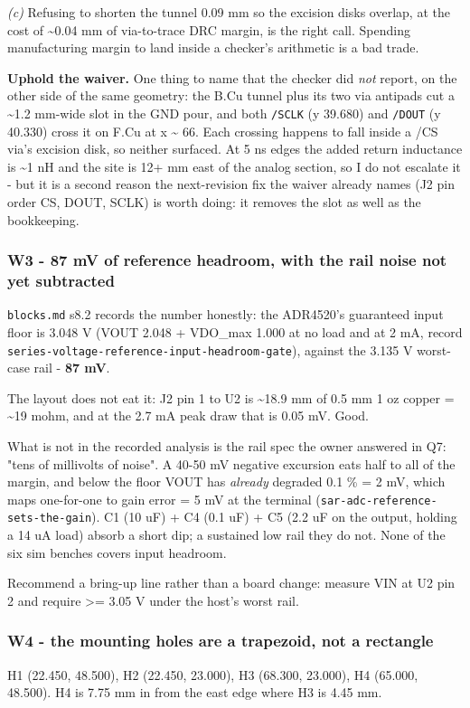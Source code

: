 \documentclass[11pt,a4paper]{article}
\begin{document}
\emph{(c)} Refusing to shorten the tunnel 0.09 mm so the excision disks overlap, at the cost of \textasciitilde{}0.04 mm of via-to-trace DRC margin, is the right call. Spending manufacturing margin to land inside a checker's arithmetic is a bad trade.

\textbf{Uphold the waiver.} One thing to name that the checker did \emph{not} report, on the other side of the same geometry: the B.Cu tunnel plus its two via antipads cut a \textasciitilde{}1.2 mm-wide slot in the GND pour, and both \texttt{/SCLK} (y 39.680) and \texttt{/DOUT} (y 40.330) cross it on F.Cu at x \textasciitilde{} 66. Each crossing happens to fall inside a /CS via's excision disk, so neither surfaced. At 5 ns edges the added return inductance is \textasciitilde{}1 nH and the site is 12+ mm east of the analog section, so I do not escalate it - but it is a second reason the next-revision fix the waiver already names (J2 pin order CS, DOUT, SCLK) is worth doing: it removes the slot as well as the bookkeeping.

\subsubsection*{W3 - 87 mV of reference headroom, with the rail noise not yet subtracted}
\texttt{blocks.md} s8.2 records the number honestly: the ADR4520's guaranteed input floor is 3.048 V (VOUT 2.048 + VDO\_max 1.000 at no load and at 2 mA, record \texttt{series-voltage-reference-input-headroom-gate}), against the 3.135 V worst-case rail - \textbf{87 mV}.

The layout does not eat it: J2 pin 1 to U2 is \textasciitilde{}18.9 mm of 0.5 mm 1 oz copper = \textasciitilde{}19 mohm, and at the 2.7 mA peak draw that is 0.05 mV. Good.

What is not in the recorded analysis is the rail spec the owner answered in Q7: "tens of millivolts of noise". A 40-50 mV negative excursion eats half to all of the margin, and below the floor VOUT has \emph{already} degraded 0.1 \% = 2 mV, which maps one-for-one to gain error = 5 mV at the terminal (\texttt{sar-adc-reference-sets-the-gain}). C1 (10 uF) + C4 (0.1 uF) + C5 (2.2 uF on the output, holding a 14 uA load) absorb a short dip; a sustained low rail they do not. None of the six sim benches covers input headroom.

Recommend a bring-up line rather than a board change: measure VIN at U2 pin 2 and require \textgreater{}= 3.05 V under the host's worst rail.

\subsubsection*{W4 - the mounting holes are a trapezoid, not a rectangle}
H1 (22.450, 48.500), H2 (22.450, 23.000), H3 (68.300, 23.000), H4 (65.000, 48.500). H4 is 7.75 mm in from the east edge where H3 is 4.45 mm.
\end{document}
